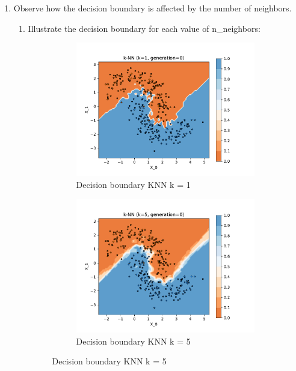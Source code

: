 \documentclass[acmconf,nonacm=true]{acmart}
\begin{document}
\begin{enumerate}
    \item 
    Observe how the decision boundary is affected by the number of neighbors.
    \begin{enumerate}
        \item 
         Illustrate the decision boundary for each value of n\_neighbors:
         \begin{figure}[H]
            \centering
                \begin{subfigure}[t]{.495\textwidth}
                    \includegraphics[width =1.2\textwidth]{knn_k_1_gen_0.pdf}
                    \caption{Decision boundary KNN k = 1}
                    \label{fig:knn_1}
                \end{subfigure}
                \hfill
                \begin{subfigure}[t]{.495\textwidth}
                    \includegraphics[width =1.2\textwidth]{knn_k_5_gen_0.pdf}
                    \caption{Decision boundary KNN k = 5}
                    \label{fig:knn_5}
                \end{subfigure}
            \label{fig:knn_1_5}
        \end{figure}
        

\end{enumerate}
\end{enumerate}
\end{document}
